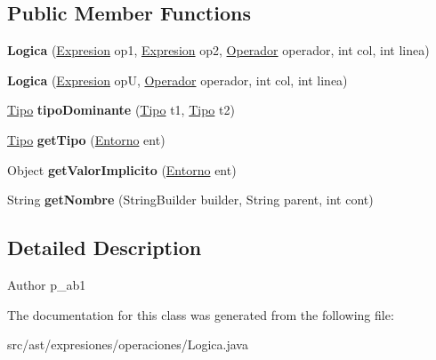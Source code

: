\subsection*{Public Member Functions}
\begin{DoxyCompactItemize}
\item 
\mbox{\label{classast_1_1expresiones_1_1operaciones_1_1_logica_af541241d78a1c5797c0538c4d42da81a}} 
{\bfseries Logica} (\mbox{\hyperlink{interfaceast_1_1_expresion}{Expresion}} op1, \mbox{\hyperlink{interfaceast_1_1_expresion}{Expresion}} op2, \mbox{\hyperlink{enumast_1_1expresiones_1_1operaciones_1_1_operacion_1_1_operador}{Operador}} operador, int col, int linea)
\item 
\mbox{\label{classast_1_1expresiones_1_1operaciones_1_1_logica_a85f9a27373244ec27657c05a1de7b043}} 
{\bfseries Logica} (\mbox{\hyperlink{interfaceast_1_1_expresion}{Expresion}} opU, \mbox{\hyperlink{enumast_1_1expresiones_1_1operaciones_1_1_operacion_1_1_operador}{Operador}} operador, int col, int linea)
\item 
\mbox{\label{classast_1_1expresiones_1_1operaciones_1_1_logica_a223bc43c5881a8a4bcad4ea7dc5c025e}} 
\mbox{\hyperlink{classentorno_1_1_tipo}{Tipo}} {\bfseries tipo\+Dominante} (\mbox{\hyperlink{classentorno_1_1_tipo}{Tipo}} t1, \mbox{\hyperlink{classentorno_1_1_tipo}{Tipo}} t2)
\item 
\mbox{\label{classast_1_1expresiones_1_1operaciones_1_1_logica_afcfaee492292e2e8b96145f65e4b383e}} 
\mbox{\hyperlink{classentorno_1_1_tipo}{Tipo}} {\bfseries get\+Tipo} (\mbox{\hyperlink{classentorno_1_1_entorno}{Entorno}} ent)
\item 
\mbox{\label{classast_1_1expresiones_1_1operaciones_1_1_logica_aa945bbbec453832fbf34f6a27ea6cc63}} 
Object {\bfseries get\+Valor\+Implicito} (\mbox{\hyperlink{classentorno_1_1_entorno}{Entorno}} ent)
\item 
\mbox{\label{classast_1_1expresiones_1_1operaciones_1_1_logica_a94e434f3871c114bb1191fcbb182b77f}} 
String {\bfseries get\+Nombre} (String\+Builder builder, String parent, int cont)
\end{DoxyCompactItemize}


\subsection{Detailed Description}
\begin{DoxyAuthor}{Author}
p\+\_\+ab1 
\end{DoxyAuthor}


The documentation for this class was generated from the following file\+:\begin{DoxyCompactItemize}
\item 
src/ast/expresiones/operaciones/Logica.\+java\end{DoxyCompactItemize}
